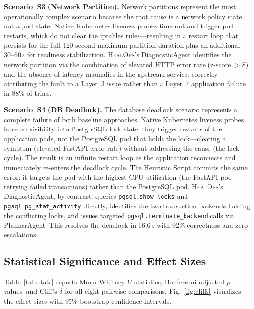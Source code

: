\documentclass[journal,10pt,twoside]{IEEEtran}
\newcommand{\HealOps}{\textsc{HealOps}}
\begin{document}
\textbf{Scenario~S3 (Network Partition).}
Network partitions represent the most operationally complex scenario
because the root cause is a network policy state, not a pod state.
Native Kubernetes liveness probes time out and trigger pod restarts,
which do not clear the iptables rules---resulting in a restart loop
that persists for the full 120-second maximum partition duration plus
an additional 30--60\,s for readiness stabilization. \HealOps{}'s
DiagnosticAgent identifies the network partition via the combination of
elevated HTTP error rate (z-score $> 8$) and the absence of latency
anomalies in the upstream service, correctly attributing the fault
to a Layer~3 issue rather than a Layer~7 application failure in 88\%
of trials.

\textbf{Scenario~S4 (DB Deadlock).}
The database deadlock scenario represents a complete failure of both
baseline approaches. Native Kubernetes liveness probes have no visibility
into PostgreSQL lock state; they trigger restarts of the application pods,
not the PostgreSQL pod that holds the lock---clearing a symptom (elevated
FastAPI error rate) without addressing the cause (the lock cycle).
The result is an infinite restart loop as the application reconnects
and immediately re-enters the deadlock cycle. The Heuristic Script
commits the same error: it targets the pod with the highest CPU
utilization (the FastAPI pod retrying failed transactions) rather than
the PostgreSQL pod. \HealOps{}'s DiagnosticAgent, by contrast, queries
\texttt{pgsql.show\_locks} and \texttt{pgsql.pg\_stat\_activity} directly,
identifies the two transaction backends holding the conflicting locks,
and issues targeted \texttt{pgsql.terminate\_backend} calls via
PlannerAgent. This resolves the deadlock in 16.6\,s with 92\%
correctness and zero escalations.

\subsection{Statistical Significance and Effect Sizes}

Table~\ref{tab:stats} reports Mann-Whitney $U$ statistics,
Bonferroni-adjusted $p$-values, and Cliff's $\delta$ for all eight
pairwise comparisons. Fig.~\ref{fig:cliffs} visualizes the effect sizes
with 95\% bootstrap confidence intervals.
\end{document}
